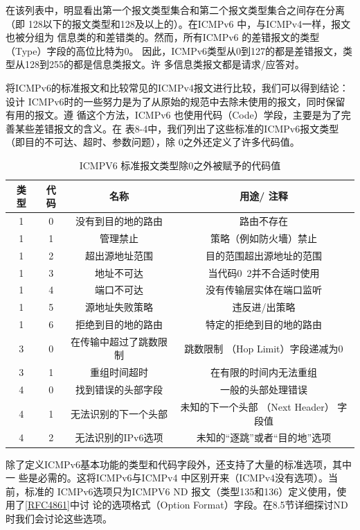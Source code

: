 在该列表中，明显看出第一个报文类型集合和第二个报文类型集合之间存在分离（即
128以下的报文类型和128及以上的）。在ICMPv6 中，与ICMPv4一样，报文也被分组为
信息类的和差错类的。然而，所有ICMPv6 的差错报文的类型（Type）字段的高位比特为0。
因此，ICMPv6类型从0到127的都是差错报文，类型从128到255的都是信息类报文。许
多信息类报文都是请求/应答对。

将ICMPv6的标准报文和比较常见的ICMPv4报文进行比较，我们可以得到结论：设计
ICMPv6时的一些努力是为了从原始的规范中去除未使用的报文，同时保留有用的报文。遵
循这个方法，ICMPv6 也使用代码（Code）学段，主要是为了完善某些差错报文的含义。在
表8-4中，我们列出了这些标准的ICMPv6报文类型（即目的不可达、超时、参数问题），除
0之外还定义了许多代码值。
\begin{table}[]
    \centering
    \caption{ICMPV6 标准报文类型除0之外被赋予的代码值}
    \begin{tabular}{c|c|c|c}
        \hline
			类 型	&	代码	&	名称	&	用途/ 注释 \\ \hline
			1	&	0	&	没有到目的地的路由	&	路由不存在 \\ \hline
			1	&	1	&	管理禁止	&	策略（例如防火墻）禁止 \\ \hline
			1	&	2	&	超出源地址范围	&	目的范围超出源地址的范围 \\ \hline
			1	&	3	&	地址不可达	&	当代码0~2并不合适时使用 \\ \hline
			1	&	4	&	端口不可达	&	没有传输层实体在端口监听 \\ \hline
			1	&	5	&	源地址失败策略	&	违反进/出策略 \\ \hline
			1	&	6	&	拒绝到目的地的路由	&	特定的拒绝到目的地的路由 \\ \hline
			3	&	0	&	在传输中超过了跳数限制	&	跳数限制 （Hop Limit）字段递减为0 \\ \hline
			3	&	1	&	重组时间超时	&	在有限的时间内无法重组 \\ \hline
			4	&	0	&	找到错误的头部字段	&	一般的头部处理错误 \\ \hline
			4	&	1	&	无法识别的下一个头部	&	未知的下一个头部 （Next Header） 字段值 \\ \hline
			4	&	2	&	无法识别的IPv6选项	&	未知的“逐跳”或者“目的地”选项 \\ \hline
    \end{tabular}
\end{table}

除了定义ICMPv6基本功能的类型和代码字段外，还支持了大量的标准选项，其中一
些是必需的。这将ICMPv6与ICMPv4 中区别开来（ICMPv4没有选项）。当前，标准的
ICMPv6选项只为ICMPV6 ND 报文（类型135和136）定义使用，使用了\href{https://www.rfc-editor.org/rfc/rfc4861}{[RFC4861]}中讨
论的选项格式（Option Format）字段。在8.5节详细探讨ND 时我们会讨论这些选项。

